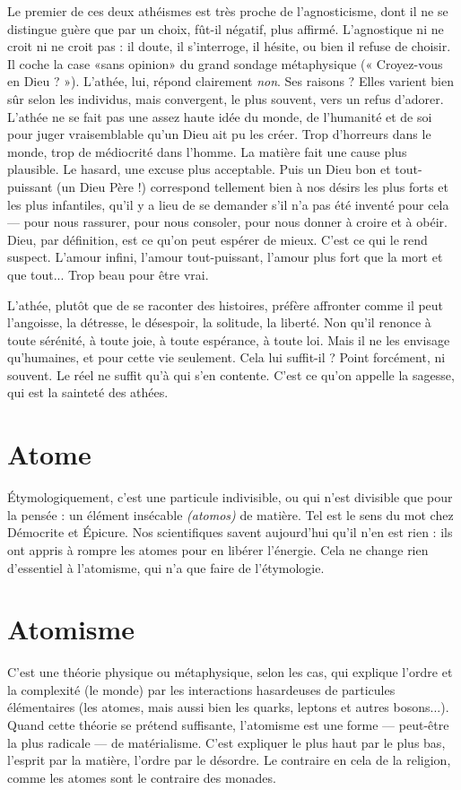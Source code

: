 Le premier de ces deux athéismes est très proche de l’agnosticisme, dont il
ne se distingue guère que par un choix, fût-il négatif, plus affirmé. L’agnostique
ni ne croit ni ne croit pas : il doute, il s’interroge, il hésite, ou bien il refuse de
choisir. Il coche la case «sans opinion» du grand sondage métaphysique
(« Croyez-vous en Dieu ? »). L’athée, lui, répond clairement {\it non}. Ses raisons ?
Elles varient bien sûr selon les individus, mais convergent, le plus souvent, vers
un refus d’adorer. L’athée ne se fait pas une assez haute idée du monde, de
l'humanité et de soi pour juger vraisemblable qu’un Dieu ait pu les créer. Trop
d’horreurs dans le monde, trop de médiocrité dans l’homme. La matière fait
une cause plus plausible. Le hasard, une excuse plus acceptable. Puis un Dieu
bon et tout-puissant (un Dieu Père !) correspond tellement bien à nos désirs les
plus forts et les plus infantiles, qu’il y a lieu de se demander s’il n’a pas été
inventé pour cela — pour nous rassurer, pour nous consoler, pour nous donner
à croire et à obéir. Dieu, par définition, est ce qu’on peut espérer de mieux.
C’est ce qui le rend suspect. L'amour infini, l'amour tout-puissant, l'amour
plus fort que la mort et que tout... Trop beau pour être vrai.

L’athée, plutôt que de se raconter des histoires, préfère affronter comme il
peut l’angoisse, la détresse, le désespoir, la solitude, la liberté. Non qu'il
renonce à toute sérénité, à toute joie, à toute espérance, à toute loi. Mais il ne
les envisage qu’humaines, et pour cette vie seulement. Cela lui suffit-il ? Point
forcément, ni souvent. Le réel ne suffit qu’à qui s’en contente. C’est ce qu’on
appelle la sagesse, qui est la sainteté des athées.

\section{Atome}
Étymologiquement, c’est une particule indivisible, ou qui n’est divisible
que pour la pensée : un élément insécable {\it (atomos)} de matière.
Tel est le sens du mot chez Démocrite et Épicure. Nos scientifiques savent
aujourd’hui qu’il n’en est rien : ils ont appris à rompre les atomes pour en
libérer l'énergie. Cela ne change rien d’essentiel à l’atomisme, qui n’a que faire
de l’étymologie.

\section{Atomisme}
C'est une théorie physique ou métaphysique, selon les cas, qui
explique l’ordre et la complexité (le monde) par les interactions
hasardeuses de particules élémentaires (les atomes, mais aussi bien les quarks, leptons
et autres bosons...). Quand cette théorie se prétend suffisante, l’atomisme
est une forme — peut-être la plus radicale — de matérialisme. C’est expliquer le
plus haut par le plus bas, l'esprit par la matière, l’ordre par le désordre. Le
contraire en cela de la religion, comme les atomes sont le contraire des monades.

